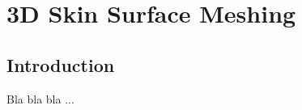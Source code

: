 
\chapter{3D Skin Surface Meshing}
\label{chapterSkinSurface}

\minitoc

\section{Introduction}
\label{sectionSkinSurfaceIntro}

Bla bla bla ...




